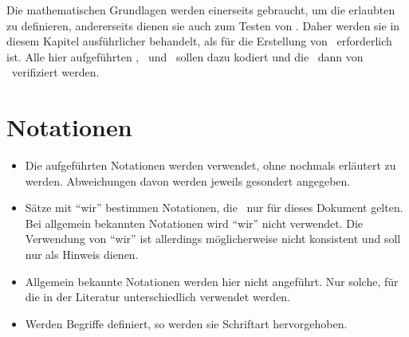 Die mathematischen Grundlagen werden einerseits gebraucht, um die erlaubten \Beweisschritte{} zu definieren, andererseits dienen sie auch zum Testen von \ASBA.
Daher werden sie in diesem Kapitel ausführlicher behandelt, als für die Erstellung von \ASBA\ erforderlich ist.
Alle hier aufgeführten \Axiome, \Saetze\ und \Beweise\ sollen dazu kodiert und die \Beweise\ dann von \ASBA\ verifiziert werden.

\section{Notationen}%
\label{sec:Notationen}

\begin{itemize}
	\item Die  aufgeführten Notationen werden  verwendet, ohne nochmals erläutert zu werden. Abweichungen davon werden jeweils gesondert angegeben.
	\item Sätze mit \enquote{wir} bestimmen Notationen, die \textevtl\ nur für dieses Dokument gelten.
	Bei allgemein bekannten Notationen wird \enquote{wir} nicht verwendet.
	Die Verwendung von \enquote{wir} ist allerdings möglicherweise nicht konsistent und soll nur als Hinweis dienen.
	\item Allgemein bekannte Notationen werden hier nicht angeführt.
	Nur solche, für die in der Literatur unterschiedlich verwendet werden.
	\item Werden Begriffe definiert, so werden sie  Schriftart hervorgehoben.
\end{itemize}
